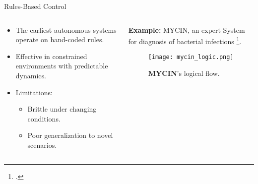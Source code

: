 \documentclass[xcolor={svgnames},aspectratio=169]{beamer}
\begin{document}
\begin{frame}{Rules-Based Control}
    \begin{columns}
        \begin{column}{0.6\textwidth}
            \begin{itemize}
                \item The earliest autonomous systems operate on hand-coded rules.
                \item Effective in constrained environments with predictable dynamics.
                \item Limitations:
                \begin{itemize}
                    \item Brittle under changing conditions.
                    \item Poor generalization to novel scenarios.
                \end{itemize}
            \end{itemize}
        \end{column}
        \begin{column}{0.4\textwidth}
            \textbf{Example:}
            MYCIN, an expert System for diagnosis of bacterial infections \footcite{buchanan1984}.
            \begin{figure}[!h]
                \centering
                \texttt{[image: mycin\_logic.png]}
                \caption{\textbf{MYCIN}'s logical flow.}
                \label{fig:mycin_logic}
            \end{figure}
        \end{column}
    \end{columns}
\end{frame}
\end{document}
